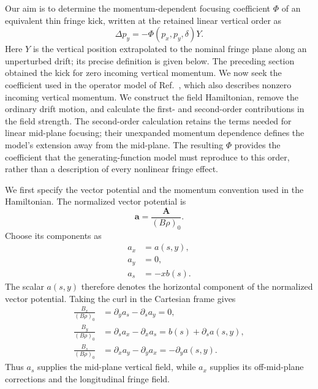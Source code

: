 Our aim is to determine the momentum-dependent focusing coefficient $\Phi$
of an equivalent thin fringe kick, written at the retained linear vertical
order as
\begin{equation}
 \Delta p_y=-\Phi(p_x,p_y,\delta)Y.
\end{equation}
Here $Y$ is the vertical position extrapolated to the nominal fringe plane
along an unperturbed drift; its precise definition is given below.
The preceding section obtained the kick for zero incoming vertical momentum.
We now seek the coefficient used in the operator model of
Ref.~\cite{forest-fringe-1}, which also describes nonzero incoming vertical
momentum. We construct the field Hamiltonian, remove the ordinary drift
motion, and calculate the first- and second-order contributions in the
field strength. The second-order calculation retains the terms needed for
linear mid-plane focusing; their unexpanded momentum dependence defines the
model's extension away from the mid-plane. The resulting $\Phi$ provides
the coefficient that the generating-function model must reproduce to this
order, rather than a description of every nonlinear fringe effect.

We first specify the vector potential and the momentum convention used in
the Hamiltonian. The normalized vector potential is
\begin{equation}
 \mathbf a=\frac{\mathbf A}{(B\rho)_0}.
\end{equation}
Choose its components as
\begin{align}
 a_x&=a(s,y),\label{eq:fringe_ax}\\
 a_y&=0,\label{eq:fringe_ay}\\
 a_s&=-x b(s).\label{eq:fringe_as}
\end{align}
The scalar $a(s,y)$ therefore denotes the horizontal component of the
normalized vector potential. Taking the curl in the Cartesian frame gives
\begin{align}
 \frac{B_x}{(B\rho)_0}
 &=\partial_y a_s-\partial_s a_y=0,\\
 \frac{B_y}{(B\rho)_0}
 &=\partial_s a_x-\partial_x a_s=b(s)+\partial_s a(s,y),
 \label{eq:fringe_curl_by}\\
 \frac{B_s}{(B\rho)_0}
 &=\partial_x a_y-\partial_y a_x=-\partial_y a(s,y).
 \label{eq:fringe_curl_bs}
\end{align}
Thus $a_s$ supplies the mid-plane vertical field, while $a_x$ supplies its
off-mid-plane corrections and the longitudinal fringe field.

